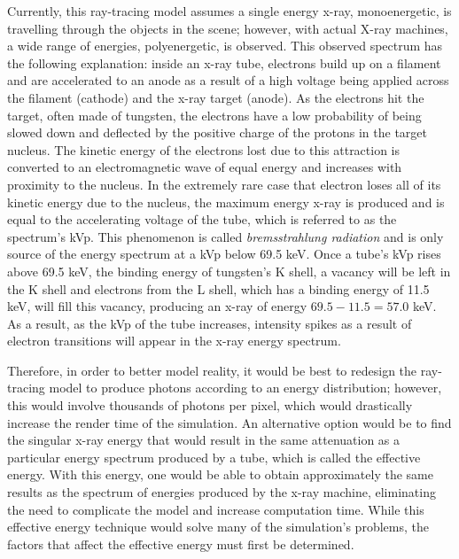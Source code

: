 Currently, this ray-tracing model assumes a single energy x-ray, monoenergetic, is travelling through the objects in the scene; however, with actual X-ray machines, a wide range of energies, polyenergetic, is observed. This observed spectrum has the following explanation: inside an x-ray tube, electrons build up on a filament and are accelerated to an anode as a result of a high voltage being applied across the filament (cathode) and the x-ray target (anode). As the electrons hit the target, often made of tungsten, the electrons have a low probability of being slowed down and deflected by the positive charge of the protons in the target nucleus. The kinetic energy of the electrons lost due to this attraction is converted to an electromagnetic wave of equal energy and increases with proximity to the nucleus. In the extremely rare case that electron loses all of its kinetic energy due to the nucleus, the maximum energy x-ray is produced and is equal to the accelerating voltage of the tube, which is referred to as the spectrum's kVp.  This phenomenon is called \textit{bremsstrahlung radiation} and is only source of the energy spectrum at a kVp below 69.5 keV. Once a tube's kVp rises above 69.5 keV, the binding energy of tungsten's K shell, a vacancy will be left in the K shell and electrons from the L shell, which has a binding energy of 11.5 keV, will fill this vacancy, producing an x-ray of energy $69.5 - 11.5 = 57.0$ keV. As a result, as the kVp of the tube increases, intensity spikes as a result of electron transitions will appear in the x-ray energy spectrum. \cite{Seibert}

Therefore, in order to better model reality, it would be best to redesign the ray-tracing model to produce photons according to an energy distribution; however, this would involve thousands of photons per pixel, which would drastically increase the render time of the simulation. An alternative option would be to find the singular x-ray energy that would result in the same attenuation as a particular energy spectrum produced by a tube, which is called the effective energy. \cite{Seibert} With this energy, one would be able to obtain approximately the same results as the spectrum of energies produced by the x-ray machine, eliminating the need to complicate the model and increase computation time. While this effective energy technique would solve many of the simulation's problems, the factors that affect the effective energy must first be determined.


